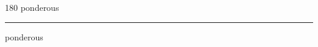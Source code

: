
\begin{frame}
\begin{center}
\begin{turn}{180}
{\fontsize{2.5cm}{1em}\selectfont ponderous}
\end{turn}
\vspace{1em}\par  
\hrule
\vspace{1em}\par  
{\fontsize{2.5cm}{1em}\selectfont ponderous}
\end{center}
\end{frame}
